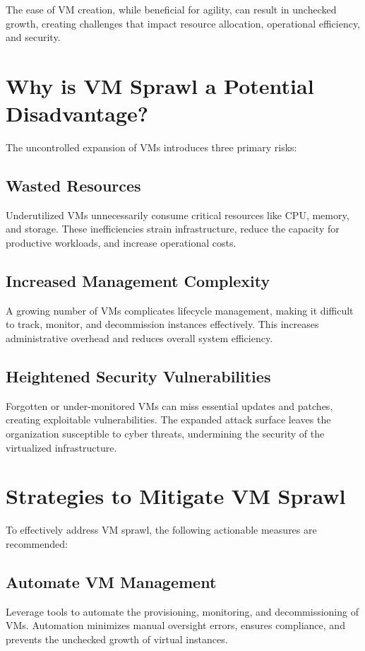 \documentclass[11pt,a4paper,twocolumn]{article}
\begin{document}
The ease of VM creation, while beneficial for agility, can result in unchecked growth, creating challenges that impact resource allocation, operational efficiency, and security.

\section{Why is VM Sprawl a Potential Disadvantage?}
The uncontrolled expansion of VMs introduces three primary risks:

\subsection{Wasted Resources}
Underutilized VMs unnecessarily consume critical resources like CPU, memory, and storage. These inefficiencies strain infrastructure, reduce the capacity for productive workloads, and increase operational costs.

\subsection{Increased Management Complexity}
A growing number of VMs complicates lifecycle management, making it difficult to track, monitor, and decommission instances effectively. This increases administrative overhead and reduces overall system efficiency.

\subsection{Heightened Security Vulnerabilities}
Forgotten or under-monitored VMs can miss essential updates and patches, creating exploitable vulnerabilities. The expanded attack surface leaves the organization susceptible to cyber threats, undermining the security of the virtualized infrastructure.

\section{Strategies to Mitigate VM Sprawl}
To effectively address VM sprawl, the following actionable measures are recommended:

\subsection{Automate VM Management}
Leverage tools to automate the provisioning, monitoring, and decommissioning of VMs. Automation minimizes manual oversight errors, ensures compliance, and prevents the unchecked growth of virtual instances.
\end{document}
